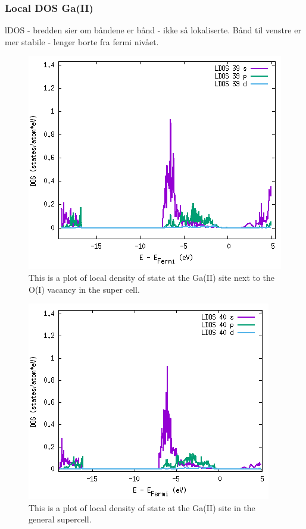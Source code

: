\subsubsection{Local DOS Ga(II)}

lDOS - bredden sier om båndene er bånd - ikke så lokaliserte. Bånd til venstre er mer stabile - lenger borte fra fermi nivået.

\begin{figure}[H]
\includegraphics[width=\linewidth]{../fig/dosplot/ldos_Ga_II_OI_vac_nabo}\caption{This is a plot of local density of state at the Ga(II) site next to the O(I) vacancy in the super cell.}\label{fig:ldos_Ga_II_nabo}
\end{figure}

\begin{figure}[H]
\includegraphics[width=\linewidth]{../fig/dosplot/ldos_Ga_II_supercell}\caption{This is a plot of local density of state at the Ga(II) site in the general supercell.}\label{fig:ldos_Ga_II_supercell}
\end{figure}

